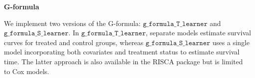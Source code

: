 \documentclass[
  11pt,
  a4paper,
]{article}
\newenvironment{Shaded}{}{}
\newcommand{\AttributeTok}[1]{\textcolor[rgb]{0.84,0.23,0.29}{#1}}
\newcommand{\CommentTok}[1]{\textcolor[rgb]{0.42,0.45,0.49}{#1}}
\newcommand{\DecValTok}[1]{\textcolor[rgb]{0.00,0.36,0.77}{#1}}
\newcommand{\FunctionTok}[1]{\textcolor[rgb]{0.44,0.26,0.76}{#1}}
\newcommand{\NormalTok}[1]{\textcolor[rgb]{0.14,0.16,0.18}{#1}}
\newcommand{\OtherTok}[1]{\textcolor[rgb]{0.44,0.26,0.76}{#1}}
\newcommand{\SpecialCharTok}[1]{\textcolor[rgb]{0.00,0.36,0.77}{#1}}
\newcommand{\StringTok}[1]{\textcolor[rgb]{0.01,0.18,0.38}{#1}}
\theoremstyle{plain}
\theoremstyle{plain}
\theoremstyle{plain}
\theoremstyle{definition}
\theoremstyle{remark}
\begin{document}
\begin{Shaded}
\end{Shaded}

\textbf{G-formula}

We implement two versions of the G-formula:
\(\texttt{g\_formula\_T\_learner}\) and
\(\texttt{g\_formula\_S\_learner}\). In
\(\texttt{g\_formula\_T\_learner}\), separate models estimate survival
curves for treated and control groups, whereas
\(\texttt{g\_formula\_S\_learner}\) uses a single model incorporating
both covariates and treatment status to estimate survival time. The
latter approach is also available in the RISCA package but is limited to
Cox models.
\end{document}
